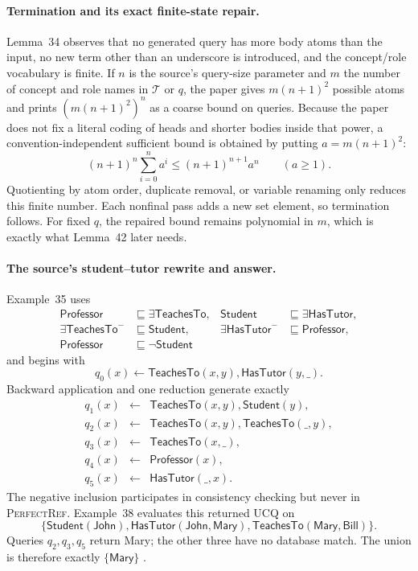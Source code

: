 \paragraph{Termination and its exact finite-state repair.}
Lemma~34 observes that no generated query has more body atoms than the input,
no new term other than an underscore is introduced, and the concept/role
vocabulary is finite.  If \(n\) is the source's query-size parameter and \(m\)
the number of concept and role names in \(\mathcal T\) or \(q\), the paper gives
\(m(n+1)^2\) possible atoms and prints
\((m(n+1)^2)^n\) as a coarse bound on queries.  Because the paper does not fix a
literal coding of heads and shorter bodies inside that power, a
convention-independent sufficient bound is obtained by putting
\(a=m(n+1)^2\):
\[
 (n+1)^n\sum_{i=0}^{n}a^i
 \leq (n+1)^{n+1}a^n\qquad(a\geq1).
\]
Quotienting by atom order, duplicate removal, or variable renaming only reduces
this finite number.  Each nonfinal pass adds a new set element, so termination
follows.  For fixed \(q\), the repaired bound remains polynomial in \(m\),
which is exactly what Lemma~42 later needs.

\paragraph{The source's student--tutor rewrite and answer.}
Example~35 uses
\[
\begin{aligned}
 \mathsf{Professor}&\sqsubseteq\exists\mathsf{TeachesTo},&
 \mathsf{Student}&\sqsubseteq\exists\mathsf{HasTutor},\\
 \exists\mathsf{TeachesTo}^{-}&\sqsubseteq\mathsf{Student},&
 \exists\mathsf{HasTutor}^{-}&\sqsubseteq\mathsf{Professor},\\
 \mathsf{Professor}&\sqsubseteq\neg\mathsf{Student}
\end{aligned}
\]
and begins with
\[
 q_0(x)\leftarrow
 \mathsf{TeachesTo}(x,y),\mathsf{HasTutor}(y,\_).
\]
Backward application and one reduction generate exactly
\[
\begin{array}{rcl}
 q_1(x)&\leftarrow&\mathsf{TeachesTo}(x,y),\mathsf{Student}(y),\\
 q_2(x)&\leftarrow&\mathsf{TeachesTo}(x,y),\mathsf{TeachesTo}(\_,y),\\
 q_3(x)&\leftarrow&\mathsf{TeachesTo}(x,\_),\\
 q_4(x)&\leftarrow&\mathsf{Professor}(x),\\
 q_5(x)&\leftarrow&\mathsf{HasTutor}(\_,x).
\end{array}
\]
The negative inclusion participates in consistency checking but never in
\textsc{PerfectRef}.  Example~38 evaluates this returned UCQ on
\[
 \{\mathsf{Student}(\mathsf{John}),
   \mathsf{HasTutor}(\mathsf{John},\mathsf{Mary}),
   \mathsf{TeachesTo}(\mathsf{Mary},\mathsf{Bill})\}.
\]
Queries \(q_2,q_3,q_5\) return Mary; the other three have no database match.
The union is therefore exactly \(\{\mathsf{Mary}\}\)
\cite[examples~35 and~38]{CalvaneseEtAl2007}.

